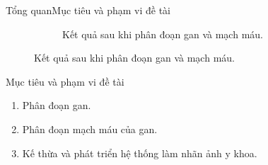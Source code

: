 \documentclass[
	10pt,                %
	aspectratio=169,     %
]{beamer}
\begin{document}
\begin{frame}{Tổng quan}{Mục tiêu và phạm vi đề tài}
\begin{figure}[h!]
\begin{subfigure}[b]{0.5\textwidth}
    			\vspace{-1mm}
    			\caption{Kết quả sau khi phân đoạn gan và mạch máu.}
			\end{subfigure}
		\end{figure}
		\vspace{-3mm}
		\begin{block}{Mục tiêu và phạm vi đề tài}
			\begin{enumerate}
				\item Phân đoạn gan.
				\item Phân đoạn mạch máu của gan.
				\item Kế thừa và phát triển hệ thống làm nhãn ảnh y khoa.
			\end{enumerate}
		\end{block}
	\end{frame}
	
\end{document}
